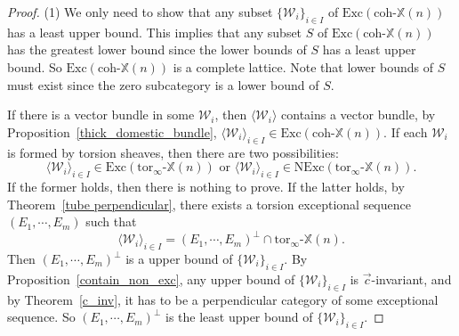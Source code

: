\documentclass[a4paper, 11pt, reqno]{amsart}
\numberwithin{equation}{section}
\theoremstyle{remark}
\theoremstyle{definition}
\begin{document}
\begin{proof}
   (1) We only need to show that any subset $\{\mathcal W_i \}_{i \in I}$ of $\mathrm{Exc}(\mathrm{coh} \text{-} \mathbb X(n))$ has a least upper bound. This implies that any subset $S$ of $\mathrm{Exc}(\mathrm{coh} \text{-} \mathbb X(n))$ has the greatest lower bound since the lower bounds of $S$ has a least upper bound. So $\mathrm{Exc}(\mathrm{coh} \text{-} \mathbb X(n))$ is a complete lattice. Note that lower bounds of $S$ must exist since the zero subcategory is a lower bound of $S$.
   
   If there is a vector bundle in some $\mathcal W_i$, then $\langle \mathcal W_i \rangle$ contains a vector bundle, by Proposition~\ref{thick_domestic_bundle}, $\langle \mathcal W_i \rangle_{i \in I} \in \mathrm{Exc}(\mathrm{coh} \text{-} \mathbb X(n))$. If each $\mathcal W_i$ is formed by torsion sheaves, then there are two possibilities: 
   \[
      \langle \mathcal W_i \rangle_{i \in I} \in \mathrm{Exc}(\mathrm{tor}_{\infty} \text{-} \mathbb X(n)) \text{ or } \langle \mathcal W_i \rangle_{i \in I} \in \mathrm{NExc}(\mathrm{tor}_{\infty} \text{-} \mathbb X(n)).
   \]
   If the former holds, then there is nothing to prove. If the latter holds, by Theorem~\ref{tube perpendicular}, there exists a torsion exceptional sequence $(E_1, \cdots, E_m)$ such that 
   \[
      \langle \mathcal W_i \rangle_{i \in I}=(E_1, \cdots, E_m)^{\perp} \cap \mathrm{tor}_{\infty} \text{-} \mathbb X(n).
   \]
   Then $(E_1, \cdots, E_m)^{\perp}$ is a upper bound of $\{\mathcal W_i \}_{i \in I}$. By Proposition~\ref{contain_non_exc}, any upper bound of $\{\mathcal W_i \}_{i \in I}$ is $\vec c$-invariant, and by Theorem~\ref{c_inv}, it has to be a perpendicular category of some exceptional sequence. So $(E_1, \cdots, E_m)^{\perp}$ is the least upper bound of $\{\mathcal W_i \}_{i \in I}$.


\end{proof}
\end{document}
